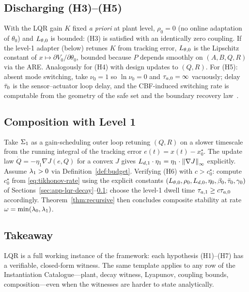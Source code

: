 \documentclass[11pt,a4paper]{article}
\def\SHAREDLATEX{../../latex}
\begin{document}
\subsection{Discharging (H3)--(H5)}
\label{sec:app-lqr-h345}
With the LQR gain $K$ fixed \emph{a priori} at plant level,
$\rho_0 = 0$ (no online adaptation of $\theta_0$) and
$L_{\theta,0}$ is bounded: (H3) is satisfied with an identically zero
coupling.  If the level-1 adapter (below) retunes $K$ from tracking
error, $L_{\theta,0}$ is the Lipschitz constant of
$x \mapsto \partial V_0/\partial \theta_0$, bounded because $P$
depends smoothly on $(A, B, Q, R)$ via the ARE.  Analogously for
(H4) with design updates to $(Q, R)$.  For (H5): absent mode
switching, take $\nu_0 = 1$ so $\ln \nu_0 = 0$ and
$\taua[0] = \infty$ vacuously; delay $\bar{\tau}_0$ is the
sensor--actuator loop delay, and the CBF-induced switching rate is
computable from the geometry of the safe set and the boundary
recovery law~\cite{ames2019cbf}.

\subsection{Composition with Level 1}
\label{sec:app-lqr-level1}
Take $\Sigma_1$ as a gain-scheduling outer loop retuning $(Q, R)$ on a
slower timescale from the running integral of the tracking error
$e(t) = x(t) - x^\star_0$.  The update law $\dot{Q} = -\eta_1 \nabla
J(e, Q)$ for a convex $J$ gives
$L_{d,1} \cdot \eta_1 = \eta_1 \cdot \left\| \nabla J \right\|_{\infty}$
explicitly.  Assume $\lambda_1 > 0$ via
Definition~\ref{def:budget}.  Verifying (H6) with
$c > c^\star_0$: compute $c^\star_0$ from
\eqref{eq:tikhonov-rate} using the explicit constants
$(L_{\theta,0}, \rho_0, L_{d,0}, \eta_0, \beta_0, \bar{\tau}_0,
\gamma_0)$ of Sections~\ref{sec:app-lqr-decay}--\ref{sec:app-lqr-h345};
choose the level-1 dwell time $\taua[1] \geq c \taua[0]$ accordingly.
Theorem~\ref{thm:recursive} then concludes composite stability at
rate $\omega = \min(\lambda_0, \lambda_1)$.

\subsection{Takeaway}
\label{sec:app-lqr-takeaway}
LQR is a full working instance of the framework: each hypothesis
(H1)--(H7) has a verifiable, closed-form witness.  The same template
applies to any row of the Instantiation Catalogue---plant, decay
witness, Lyapunov, coupling bounds, composition---even when the
witnesses are harder to state analytically.




\end{document}
